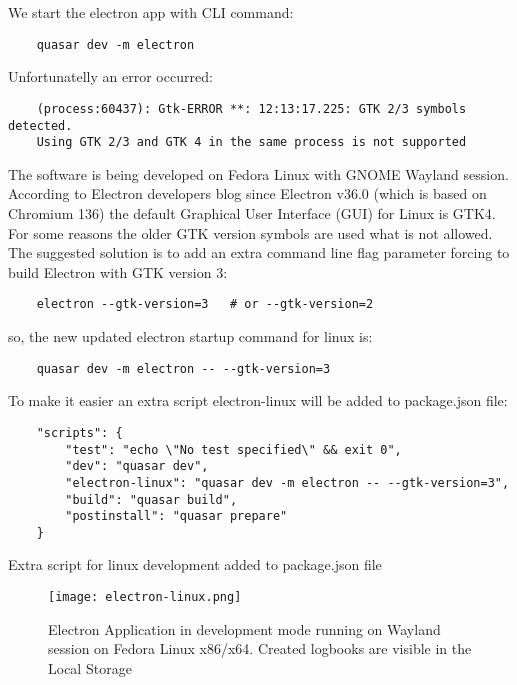 We start the electron app with CLI command:

\begin{verbatim}
    quasar dev -m electron
\end{verbatim}

Unfortunatelly an error occurred:

\begin{verbatim}
    (process:60437): Gtk-ERROR **: 12:13:17.225: GTK 2/3 symbols detected. 
    Using GTK 2/3 and GTK 4 in the same process is not supported
\end{verbatim}

The software is being developed on Fedora Linux with GNOME Wayland session. According to Electron developers blog \autocite{ElectronGTK4} since Electron v36.0 (which is based on Chromium 136) the default Graphical User Interface (GUI) for Linux is GTK4. For some reasons the older GTK version symbols are used what is not allowed. The suggested solution is to add an extra command line flag parameter forcing to build Electron with GTK version 3:

\begin{verbatim}
    electron --gtk-version=3   # or --gtk-version=2
\end{verbatim}

so, the new updated electron startup command for linux is:

\begin{verbatim}
    quasar dev -m electron -- --gtk-version=3
\end{verbatim}

To make it easier an extra script electron-linux will be added to package.json file:

\begin{listing}[H]
    \begin{verbatim}
    "scripts": {
        "test": "echo \"No test specified\" && exit 0",
        "dev": "quasar dev",
        "electron-linux": "quasar dev -m electron -- --gtk-version=3",
        "build": "quasar build",
        "postinstall": "quasar prepare"
    }
    \end{verbatim}
\caption[Quasar scripts in package.json file]{Extra script for linux development added to package.json file}
\end{listing}


\begin{figure}
    \centering
    \texttt{[image: electron-linux.png]}
    \caption[Electron development mode]{\label{fig:electronlinux} Electron Application in development mode running on Wayland session on Fedora Linux x86/x64. Created logbooks are visible in the Local Storage }
\end{figure}



